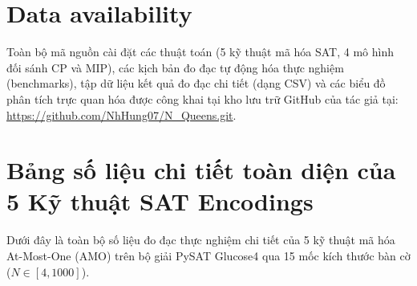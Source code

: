 \documentclass[a4paper,fleqn]{cas-sc}
\begin{document}
\section*{Data availability}
Toàn bộ mã nguồn cài đặt các thuật toán (5 kỹ thuật mã hóa SAT, 4 mô hình đối sánh CP và MIP), các kịch bản đo đạc tự động hóa thực nghiệm (benchmarks), tập dữ liệu kết quả đo đạc chi tiết (dạng CSV) và các biểu đồ phân tích trực quan hóa được công khai tại kho lưu trữ GitHub của tác giả tại: \url{https://github.com/NhHung07/N_Queens.git}.

\appendix
\section{Bảng số liệu chi tiết toàn diện của 5 Kỹ thuật SAT Encodings}
\label{app:detailed_data}

Dưới đây là toàn bộ số liệu đo đạc thực nghiệm chi tiết của 5 kỹ thuật mã hóa At-Most-One (AMO) trên bộ giải PySAT Glucose4 qua 15 mốc kích thước bàn cờ ($N \in [4, 1000]$).
\end{document}
